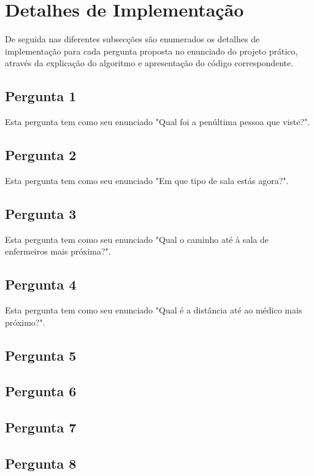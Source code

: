 \section{Detalhes de Implementação}
\label{chap3:sec:details}

De seguida nas diferentes subsecções são enumerados os detalhes de implementação para cada pergunta proposta no enunciado do projeto prático, através da explicação do algoritmo e apresentação do código correspondente.

\subsection{Pergunta 1}
\label{chap3:subsec:perg1}
Esta pergunta tem como seu enunciado "Qual foi a penúltima pessoa que viste?". 
\subsection{Pergunta 2}
\label{chap3:subsec:perg2}
Esta pergunta tem como seu enunciado "Em que tipo de sala estás agora?". 
\subsection{Pergunta 3}
\label{chap3:subsec:perg3}
Esta pergunta tem como seu enunciado "Qual o caminho até à sala de enfermeiros mais próxima?". 

\subsection{Pergunta 4}
\label{chap3:subsec:perg4}
Esta pergunta tem como seu enunciado "Qual é a distância até ao médico mais próximo?". 

\subsection{Pergunta 5}
\label{chap3:subsec:perg5}

\subsection{Pergunta 6}
\label{chap3:subsec:perg6}

\subsection{Pergunta 7}
\label{chap3:subsec:perg7}

\subsection{Pergunta 8}
\label{chap3:subsec:perg8}

